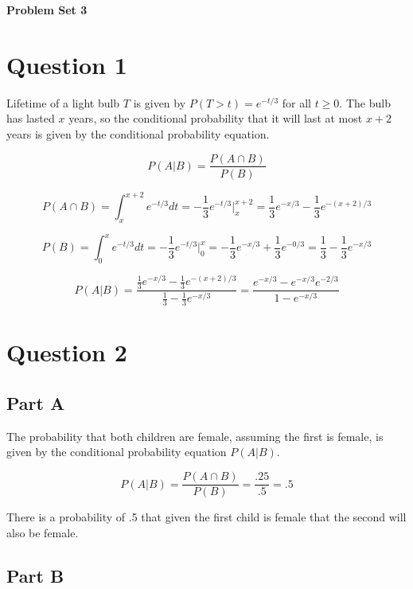 \documentclass[letterpaper]{article}
\begin{document}
\vspace*{6pt}

\noindent \textbf{\huge{Problem Set 3}}

\bigskip

\section*{Question 1}

Lifetime of a light bulb $T$ is given by $P(T>t)=e^{-t/3}$ for all $t \geq 0$. The bulb has lasted $x$ years, so the conditional probability that it will last at most $x + 2$ years is given by the conditional probability equation.

 $$P(A|B) = \frac{P(A \cap B)}{P(B)}$$

$$P(A \cap B) = \int_x^{x+2} e^{-t/3} dt = -\frac{1}{3} e^{-t/3} \Big|_x^{x+2} = \frac{1}{3} e^{-x/3} - \frac{1}{3} e^{-(x+2)/3}$$

$$P(B) = \int_0^{x} e^{-t/3} dt = -\frac{1}{3} e^{-t/3} \Big|_0^{x} = - \frac{1}{3} e^{-x/3} + \frac{1}{3} e^{-0/3} = \frac{1}{3} - \frac{1}{3} e^{-x/3}$$

$$P(A|B) = \frac{\frac{1}{3} e^{-x/3} - \frac{1}{3} e^{-(x+2)/3}}{\frac{1}{3} - \frac{1}{3} e^{-x/3}} = \frac{e^{-x/3} - e^{-x/3} e^{-2/3}}{1 - e^{-x/3}}$$






\newpage

\section*{Question 2}

\subsection*{Part A}

The probability that both children are female, assuming the first is female, is given by the conditional probability equation $P(A|B)$.

$$P(A|B) = \frac{P(A \cap B)}{P(B)} = \frac{.25}{.5} = .5$$

\noindent There is a probability of .5 that given the first child is female that the second will also be female.

\subsection*{Part B}
\end{document}

